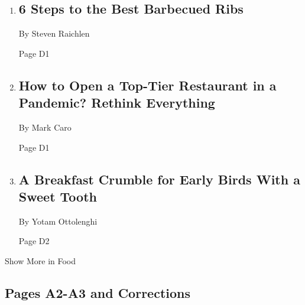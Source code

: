 \begin{enumerate}
\def\labelenumi{\arabic{enumi}.}
\item
  \href{/2020/07/24/dining/bbq-ribs-recipe.html}{}

  \hypertarget{6-steps-to-the-best-barbecued-ribs-1}{%
  \subsection{6 Steps to the Best Barbecued
  Ribs}\label{6-steps-to-the-best-barbecued-ribs-1}}

  By Steven Raichlen

  Page D1
\item
  \href{/2020/07/28/dining/ever-chicago-restaurant-coronavirus.html}{}

  \hypertarget{how-to-open-a-top-tier-restaurant-in-a-pandemic-rethink-everything}{%
  \subsection{How to Open a Top-Tier Restaurant in a Pandemic? Rethink
  Everything}\label{how-to-open-a-top-tier-restaurant-in-a-pandemic-rethink-everything}}

  By Mark Caro

  Page D1
\item
  \href{/2020/07/27/dining/breakfast-crumble-recipe.html}{}

  \hypertarget{a-breakfast-crumble-for-early-birds-with-a-sweet-tooth}{%
  \subsection{A Breakfast Crumble for Early Birds With a Sweet
  Tooth}\label{a-breakfast-crumble-for-early-birds-with-a-sweet-tooth}}

  By Yotam Ottolenghi

  Page D2
\end{enumerate}

Show More in Food

\hypertarget{pages-a2-a3-and-corrections}{%
\subsection{Pages A2-A3 and
Corrections}\label{pages-a2-a3-and-corrections}}

